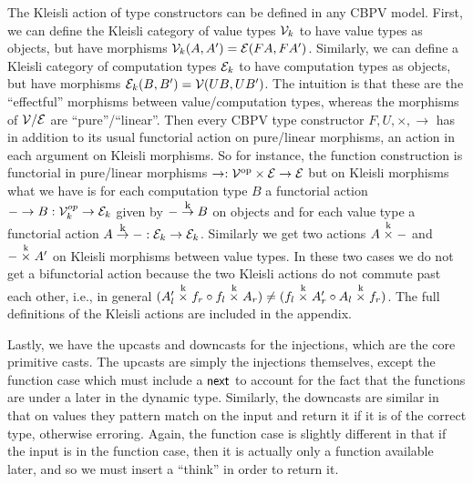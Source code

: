 The Kleisli action of type constructors can be defined in any CBPV
model. First, we can define the Kleisli category of value types
$\mathcal{V}_k$ to have value types as objects, but have morphisms
$\mathcal{V}_k(A,A') = \mathcal{E}(FA,FA')$. Similarly, we can define a Kleisli
category of computation types $\mathcal{E}_k$ to have computation types as
objects, but have morphisms $\mathcal{E}_k(B,B') = \mathcal{V}(UB,UB')$. The
intuition is that these are the ``effectful'' morphisms between
value/computation types, whereas the morphisms of $\mathcal{V}/\mathcal{E}$ are
``pure''/``linear''. Then every CBPV type constructor $F,U,\times,\to$
has in addition to its usual functorial action on pure/linear
morphisms, an action in each argument on Kleisli morphisms. So for
instance, the function construction is functorial in pure/linear
morphisms $\to : {\mathcal{V}}^{\textrm{op}} \times \mathcal{E} \to \mathcal{E}$ but on Kleisli
morphisms what we have is for each computation type $B$ a functorial
action $-\to B : \mathcal{V}_k^{op} \to \mathcal{E}_k$ given by $-\mathrel{\mathop{\to}\limits^{\textrm{\footnotesize k}}} B$ on
objects and for each value type a functorial action $A \mathrel{\mathop{\to}\limits^{\textrm{\footnotesize k}}} - :
\mathcal{E}_k \to \mathcal{E}_k$. Similarly we get two actions $A \mathrel{\mathop{\times}\limits^{\textrm{k}}} -$ and
$-\mathrel{\mathop{\times}\limits^{\textrm{k}}} A'$ on Kleisli morphisms between value types. In these two
cases we do not get a bifunctorial action because the two Kleisli
actions do not commute past each other, i.e., in general $(A_l'
\mathrel{\mathop{\times}\limits^{\textrm{k}}} f_r \circ f_l \mathrel{\mathop{\times}\limits^{\textrm{k}}} A_r) \neq (f_l \mathrel{\mathop{\times}\limits^{\textrm{k}}} A_r' \circ A_l
\mathrel{\mathop{\times}\limits^{\textrm{k}}} f_r)$. The full definitions of the Kleisli actions are
included in the appendix.

Lastly, we have the upcasts and downcasts for the injections, which
are the core primitive casts. The upcasts are simply the injections
themselves, except the function case which must include a $\mathsf{next}$ to
account for the fact that the functions are under a later in the
dynamic type. Similarly, the downcasts are similar in that on values
they pattern match on the input and return it if it is of the correct
type, otherwise erroring. Again, the function case is slightly
different in that if the input is in the function case, then it is
actually only a function available later, and so we must insert a
``think'' in order to return it.



